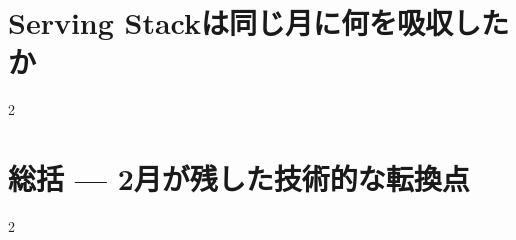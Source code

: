 \documentclass[lualatex,a4paper,11pt]{jlreq}
\begin{document}
\Needspace{0.45\textheight}
\bigskip
\section{Serving Stackは同じ月に何を吸収したか}
\label{pkg:serving-stack-catches-up}
\vspace{0.15em}
\begin{multicols}{2}

\end{multicols}

\medskip


\Needspace{0.45\textheight}
\bigskip
\section{総括 — 2月が残した技術的な転換点}
\label{pkg:closing-synthesis}
\vspace{0.15em}
\begin{multicols}{2}

\end{multicols}

\medskip


\Needspace{0.30\textheight}
\bigskip
\printbibliography[title={References / Source Notes}]
\end{document}
